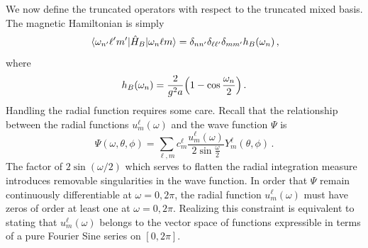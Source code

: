 \documentclass[reprint,superscriptaddress,pra,nofootinbib,preprintnumbers,floatfix]{revtex4-1}
\begin{document}
We now define the truncated operators with respect to the truncated mixed basis. 
%
The magnetic Hamiltonian is simply
%
\begin{equation}
    \mel{\omega_{n'} \ell' m'}{\hat{H}_B}{\omega_n \ell m}
      = \delta_{nn'}\delta_{\ell\ell'} \delta_{mm'} h_B(\omega_n) \,,
\end{equation}
%
where
%
\begin{equation}
    h_B(\omega_n) = \frac{2}{g^2 a} \pqty{1 - \cos \frac{\omega_n}{2}}
    \,.
\end{equation}
%
Handling the radial function requires some care. 
%
Recall that the relationship between the radial functions $u^\ell_m(\omega)$ and the wave function $\Psi$ is
%
\begin{equation}
\Psi(\omega,\theta,\phi) = \sum_{\ell,m} c^\ell_m \frac{u^\ell_m(\omega)}{2\sin\frac{\omega}{2}}Y^\ell_m(\theta,\phi) \,.
\end{equation}
%
The factor of $2\sin(\omega/2)$ which serves to flatten the radial integration measure introduces removable singularities in the wave function. 
%
In order that $\Psi$ remain continuously differentiable at $\omega=0, 2\pi$, the radial function $u^\ell_m(\omega)$ must have zeros of order at least one at $\omega=0, 2\pi$.
%
Realizing this constraint is equivalent to stating that $u^\ell_m(\omega)$ belongs to the vector space of functions expressible in terms of a pure Fourier Sine series on $[0,2\pi]$.
\end{document}
